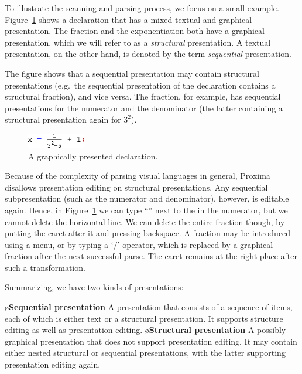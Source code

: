 \documentclass{article}[10pt]
\begin{document}

To illustrate the scanning and parsing process, we focus on a small example. Figure~\ref{fig:graphicalDecl} shows a declaration that has a mixed textual and graphical presentation. The fraction and the exponentiation both have a graphical presentation, which we will refer to as a {\em structural} presentation. A textual presentation, on the other hand, is denoted by the term {\em sequential} presentation. 

The figure shows that a sequential presentation may contain structural presentations (e.g.\ the sequential presentation of the declaration contains a structural fraction), and vice versa. The fraction, for example, has sequential presentations for the numerator and the denominator (the latter containing a structural presentation again for $3^2$).


\begin{figure}
\begin{center}
\includegraphics[width=1in]{images/scanFrac}
\end{center}
\caption{A graphically presented declaration.} \label{fig:graphicalDecl} 
\end{figure}




Because of the complexity of parsing visual languages in general, Proxima disallows presentation editing on structural presentations. Any sequential subpresentation (such as the numerator and denominator), however, is editable again. Hence, in Figure~\ref{fig:graphicalDecl} we can type ``'' next to the  in the numerator, but we cannot delete the horizontal line. We can delete the entire fraction though, by putting the caret after it and pressing backspace. A fraction may be introduced using a menu, or by typing a `$/$' operator, which is replaced by a graphical fraction after the next successful parse. The caret remains at the right place after such a transformation.

Summarizing, we have two kinds of presentations:

\bl
\o {\bf Sequential presentation} A presentation that consists of a sequence of items, each of which is either text or a structural presentation. It supports structure editing as well as presentation editing.
\o {\bf Structural presentation} A possibly graphical presentation that does not support presentation editing. It may contain either nested structural or sequential presentations, with the latter supporting presentation editing again.
\el
\end{document}
